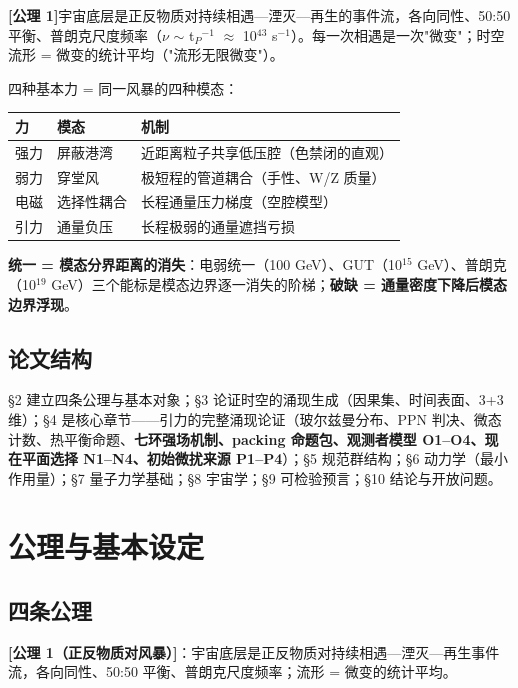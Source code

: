 \documentclass[UTF8,fontset=windows]{csoarticle}
\newcommand{\mtag}[1]{\textbf{[#1]}}
\newcommand{\up}[1]{\ensuremath{^{#1}}}
\newcommand{\down}[1]{\ensuremath{_{#1}}}
\begin{document}
\mtag{公理 1}宇宙底层是正反物质对持续相遇---湮灭---再生的事件流，各向同性、50:50 平衡、普朗克尺度频率（\ensuremath{\nu} \ensuremath{\sim} t\down{P}\up{-1} \ensuremath{\approx} 10\up{43} s\up{-1}）。每一次相遇是一次"微变"；时空流形 = 微变的统计平均（"流形无限微变"）。

四种基本力 = 同一风暴的四种模态：

\begin{table}[htbp]
\centering
\small
\begin{tabularx}{\textwidth}{@{}lXX@{}}
\toprule
力 & 模态 & 机制 \\
\midrule
强力 & 屏蔽港湾 & 近距离粒子共享低压腔（色禁闭的直观） \\
弱力 & 穿堂风 & 极短程的管道耦合（手性、W/Z 质量） \\
电磁 & 选择性耦合 & 长程通量压力梯度（空腔模型） \\
引力 & 通量负压 & 长程极弱的通量遮挡亏损 \\
\bottomrule
\end{tabularx}
\end{table}

\textbf{统一 = 模态分界距离的消失}：电弱统一（100 GeV）、GUT（10\up{15} GeV）、普朗克（10\up{19} GeV）三个能标是模态边界逐一消失的阶梯；\textbf{破缺 = 通量密度下降后模态边界浮现}。

\subsection{论文结构}

\S{}2 建立四条公理与基本对象；\S{}3 论证时空的涌现生成（因果集、时间表面、3+3 维）；\S{}4 是核心章节------引力的完整涌现论证（玻尔兹曼分布、PPN 判决、微态计数、热平衡命题、\textbf{七环强场机制、packing 命题包、观测者模型 O1--O4、现在平面选择 N1--N4、初始微扰来源 P1--P4}）；\S{}5 规范群结构；\S{}6 动力学（最小作用量）；\S{}7 量子力学基础；\S{}8 宇宙学；\S{}9 可检验预言；\S{}10 结论与开放问题。



\section{公理与基本设定}

\subsection{四条公理}

\textbf{\mtag{公理 1（正反物质对风暴）}}：宇宙底层是正反物质对持续相遇---湮灭---再生事件流，各向同性、50:50 平衡、普朗克尺度频率；流形 = 微变的统计平均。
\end{document}
